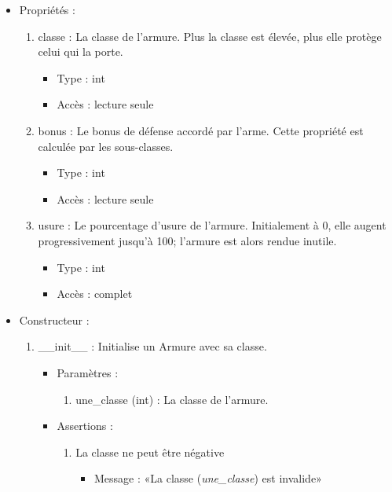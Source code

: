 \documentclass[12pt,pdftex,oneside]{article}
\begin{document}
  \begin{itemize}
  \item Propriétés : 
    \begin{enumerate}
    \item classe : La classe de l'armure. Plus la classe est élevée, plus elle
      protège celui qui la porte.
          \begin{itemize}
          \item Type : int
          \item Accès : lecture seule
          \end{itemize}
    \item bonus : Le bonus de défense accordé par l'arme. Cette propriété est
      calculée par les sous-classes.
          \begin{itemize}
          \item Type : int
          \item Accès : lecture seule
          \end{itemize}
    \item usure : Le pourcentage d'usure de l'armure. Initialement à 0, elle
      augent progressivement jusqu'à 100; l'armure est alors rendue inutile.
          \begin{itemize}
          \item Type : int
          \item Accès : complet
          \end{itemize}

    \end{enumerate}

  \item Constructeur : 

  \begin{enumerate}
  \item \_\_init\_\_ : Initialise un Armure avec sa classe.
    \begin{itemize}
    \item Paramètres : 
      \begin{enumerate}
      \item une\_classe (int) : La classe de l'armure.
      \end{enumerate}
      \item Assertions : 
        \begin{enumerate}
        \item La classe ne peut être négative
          \begin{itemize}
          \item Message : «La classe (\emph{une\_classe}) est invalide»
          \end{itemize}
        \end{enumerate}
    \end{itemize}


\end{enumerate}
\end{itemize}
\end{document}

